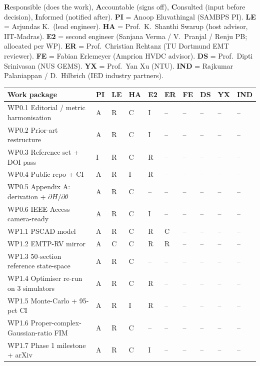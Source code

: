 \documentclass[11pt,a4paper]{article}
\begin{document}
\textbf{R}esponsible (does the work),
\textbf{A}ccountable (signs off),
\textbf{C}onsulted (input before decision),
\textbf{I}nformed (notified after).
\textbf{PI} = Anoop Eluvathingal (SAMBPS PI).
\textbf{LE} = Arjundas K.\ (lead engineer).
\textbf{HA} = Prof.\ K.\ Shanthi Swarup (host advisor, IIT-Madras).
\textbf{E2} = second engineer (Sanjana Verma / V.\ Pranjal / Renju PB; allocated per WP).
\textbf{ER} = Prof.\ Christian Rehtanz (TU Dortmund EMT reviewer).
\textbf{FE} = Fabian Erlemeyer (Amprion HVDC advisor).
\textbf{DS} = Prof.\ Dipti Srinivasan (NUS GEMS).
\textbf{YX} = Prof.\ Yan Xu (NTU).
\textbf{IND} = Rajkumar Palaniappan / D.\ Hilbrich (IED industry partners).

\renewcommand{\arraystretch}{1.10}
\begin{longtable}{L{6.0cm} *{9}{C{0.7cm}}}
\toprule{}
\textbf{Work package} & PI & LE & HA & E2 & ER & FE & DS & YX & IND\\\midrule\endhead
WP0.1 Editorial / metric harmonisation       & A & R & C & I & -- & -- & -- & -- & --\\
WP0.2 Prior-art restructure                  & A & R & C & I & -- & -- & -- & -- & --\\
WP0.3 Reference set + DOI pass               & I & R & C & R & -- & -- & -- & -- & --\\
WP0.4 Public repo + CI                       & A & R & I & R & -- & -- & -- & -- & --\\
WP0.5 Appendix A: derivation + $\partial H/\partial\theta$ & A & R & C & -- & -- & -- & -- & -- & --\\
WP0.6 IEEE Access camera-ready               & A & R & C & I & -- & -- & -- & -- & --\\
WP1.1 PSCAD model                            & A & R & C & R & C & -- & -- & -- & --\\
WP1.2 EMTP-RV mirror                         & A & C & C & R & R & -- & -- & -- & --\\
WP1.3 50-section reference state-space       & A & R & C & -- & -- & -- & -- & -- & --\\
WP1.4 Optimiser re-run on 3 simulators       & A & R & C & R & -- & -- & -- & -- & --\\
WP1.5 Monte-Carlo + 95-pct CI                & A & R & I & R & -- & -- & -- & -- & --\\
WP1.6 Proper-complex-Gaussian-ratio FIM      & A & R & C & -- & -- & -- & -- & -- & --\\
WP1.7 Phase 1 milestone + arXiv              & A & R & C & I & -- & -- & -- & -- & --\\

\end{longtable}
\end{document}
